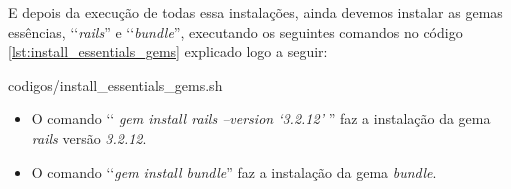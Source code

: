 E depois da execução de todas essa instalações, ainda devemos instalar as gemas essências, ‘‘\emph{rails}''
e ‘‘\emph{bundle}'', executando os seguintes comandos no código
\ref{lst:install_essentials_gems} explicado logo a seguir:


{codigos/install_essentials_gems.sh}

\begin{itemize}

 \item O comando ‘‘ \emph{gem install rails --version ‘3.2.12'} '' faz a instalação da gema \emph{rails}
 versão \emph{3.2.12}.

 \item O comando ‘‘\emph{gem install bundle}'' faz a instalação da gema \emph{bundle}.

\end{itemize}
